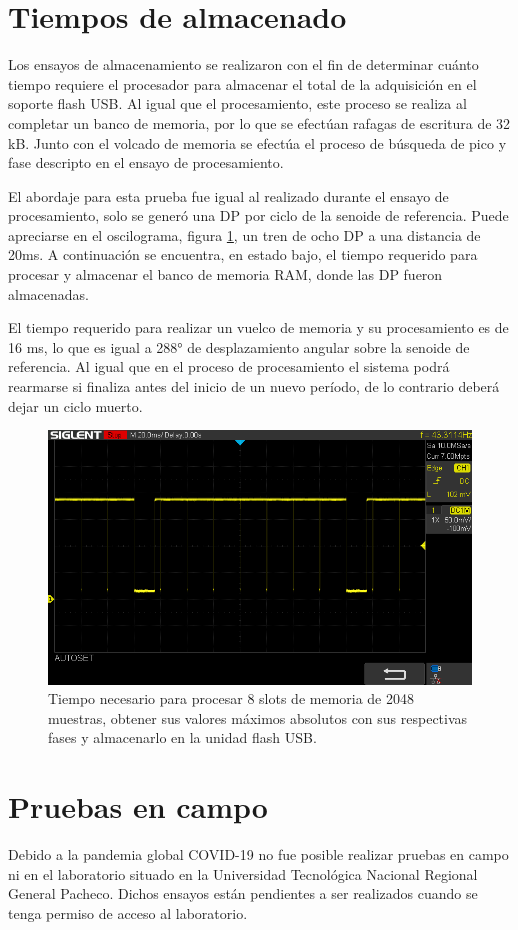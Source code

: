 \vspace{5mm}

\section{Tiempos de almacenado}

Los ensayos de almacenamiento se realizaron con el fin de determinar cuánto tiempo requiere el procesador para almacenar el total de la adquisición en el soporte flash USB. Al igual que el procesamiento, este proceso se realiza al completar un banco de memoria, por lo que se efectúan rafagas de escritura de 32 kB. Junto con el volcado de memoria se efectúa el proceso de búsqueda de pico y fase descripto en el ensayo de procesamiento. 

El abordaje para esta prueba fue igual al realizado durante el ensayo de procesamiento, solo se generó una DP por ciclo de la senoide de referencia. Puede apreciarse en el oscilograma, figura \ref{fig:tiempoSaveAll}, un tren de ocho DP a una distancia de 20ms. A continuación se encuentra, en estado bajo, el tiempo requerido para procesar y almacenar el banco de memoria RAM, donde las DP fueron almacenadas.

El tiempo requerido para realizar un vuelco de memoria y su procesamiento es de 16 ms, lo que es igual a 288° de desplazamiento angular sobre la senoide de referencia. Al igual que en el proceso de procesamiento el sistema podrá rearmarse si finaliza antes del inicio de un nuevo período, de lo contrario deberá dejar un ciclo muerto.

\begin{figure}[ht]
	\centering
	\includegraphics[width=133mm]{./Figures/tiempoSaveAll.png}
	\caption{Tiempo necesario para procesar 8 slots de memoria de 2048 muestras, obtener sus valores máximos absolutos con sus respectivas fases y almacenarlo en la unidad flash USB.}
	\label{fig:tiempoSaveAll}
\end{figure}

\vspace{5mm}
\newpage
\section{Pruebas en campo}
Debido a la pandemia global COVID-19 no fue posible realizar pruebas en campo ni en el laboratorio situado en la Universidad Tecnológica Nacional Regional General Pacheco. Dichos ensayos están pendientes a ser realizados cuando se tenga permiso de acceso al laboratorio.